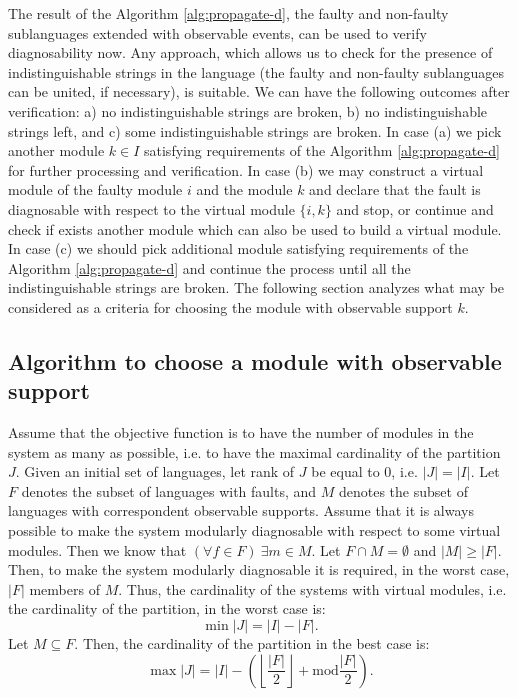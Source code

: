 \documentclass[a4paper, 10pt, conference]{ieeeconf}
\begin{document}
The result of the Algorithm \ref{alg:propagate-d}, the faulty and non-faulty
sublanguages extended with observable events, can be used to verify
diagnosability now. Any approach, which allows us to check for the presence of
indistinguishable strings in the language (the faulty and non-faulty
sublanguages can be united, if necessary), is suitable. We can have the
following outcomes after verification: a) no indistinguishable strings are
broken, b) no indistinguishable strings left, and c) some indistinguishable
strings are broken. In case (a) we pick another module $k \in I$ satisfying
requirements of the Algorithm \ref{alg:propagate-d} for further processing and
verification. In case (b) we may construct a virtual module of the faulty module
$i$ and the module $k$ and declare that the fault is diagnosable with respect to
the virtual module $\{i, k\}$ and stop, or continue and check if exists another
module which can also be used to build a virtual module. In case (c) we should
pick additional module satisfying requirements of the Algorithm
\ref{alg:propagate-d} and continue the process until all the indistinguishable
strings are broken. The following section analyzes what may be considered as a
criteria for choosing the module with observable support $k$.


\subsection{Algorithm to choose a module with observable support}
Assume that the objective function is to have the number of modules in the
system as many as possible, i.e. to have the maximal cardinality of the
partition $J$.
Given an initial set of languages, let rank of $J$ be equal to 0, i.e. $|J| =
|I|$. Let $F$ denotes the subset of languages with faults, and $M$ denotes the
subset of languages with correspondent observable supports.
Assume that it is always possible to make the system modularly diagnosable with
respect to some virtual modules. Then we know that $(\forall f \in F)~\exists m
\in M$. Let $F \cap M = \emptyset$ and $|M| \geq |F|$. Then, to make the system
modularly diagnosable it is required, in the worst case, $|F|$ members of $M$.
Thus, the cardinality of the systems with virtual modules, i.e. the cardinality
of the partition, in the worst case is:
\begin{equation}
	\min |J| = |I| - |F|.
\end{equation}
Let $M \subseteq F$. Then, the cardinality of the partition in the best case
is:
\begin{equation}
	\max |J| = |I| - \left(
		\left\lfloor \frac{|F|}{2} \right\rfloor + \textrm{mod} \frac{|F|}{2}
		\right). 
\end{equation}
\end{document}
